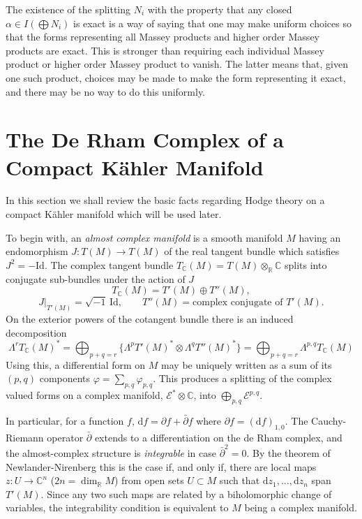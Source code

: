 \documentclass[11pt]{amsart}
\theoremstyle{plain}
\theoremstyle{definition}
\newcommand{\sE}{\mathscr{E}}
\newcommand{\dd}{\mathrm{d}}
\newcommand{\CC}{\mathbb{C}}
\newcommand{\RR}{\mathbb{R}}
\newcommand{\Id}{\mathrm{Id}}
\begin{document}
The existence of the splitting $N_{i}$ with the property that any closed $\alpha \in I(\bigoplus N_{i})$ is exact is a way of saying that one may make uniform choices so that the forms representing all Massey products and higher order Massey products are exact. This is stronger than requiring each individual Massey product or higher order Massey product to vanish. The latter means that, given one such product, choices may be made to make the form representing it exact, and there may be no way to do this uniformly.


\section{The De Rham Complex of a Compact K\"ahler Manifold}

In this section we shall review the basic facts regarding Hodge theory on a compact K\"ahler manifold which will be used later.

To begin with, an \emph{almost complex manifold} is a smooth manifold $M$ having an endomorphism $J \colon T(M) \to T(M)$ of the real tangent bundle which satisfies $J^{2} = -\Id$. The complex tangent bundle $T_{\CC}(M) = T(M) \otimes_{\RR} \CC$ splits into conjugate sub-bundles under the action of $J$
\[
T_{\CC}(M) = T'(M) \oplus T''(M),
\]
\[
J|_{T'(M)} = \sqrt{-1}\, \Id, \qquad T''(M) = \text{complex conjugate of } T'(M).
\]
On the exterior powers of the cotangent bundle there is an induced decomposition
\[
\Lambda^{r} T_{\CC}(M)^{*} = \bigoplus_{p+q=r} \{\Lambda^{p} T'(M)^{*} \otimes \Lambda^{q} T''(M)^{*}\} = \bigoplus_{p+q=r} \Lambda^{p,q} T_{\CC}(M)
\]
Using this, a differential form on $M$ may be uniquely written as a sum of its $(p,q)$ components $\varphi = \sum_{p,q} \varphi_{p,q}$. This produces a splitting of the complex valued forms on a complex manifold, $\sE^{*} \otimes \CC$, into $\bigoplus_{p,q} \sE^{p,q}$.

In particular, for a function $f$, $\dd f = \partial f + \bar{\partial} f$ where $\partial f = (\dd f)_{1,0}$. The Cauchy-Riemann operator $\bar{\partial}$ extends to a differentiation on the de Rham complex, and the almost-complex structure is \emph{integrable} in case $\bar{\partial}^{2} = 0$. By the theorem of Newlander-Nirenberg \cite{NN} this is the case if, and only if, there are local maps $z \colon U \to \CC^{n}$ ($2n = \dim_{\RR} M$) from open sets $U \subset M$ such that $\dd z_{1}, \ldots, \dd z_{n}$ span $T'(M)$. Since any two such maps are related by a biholomorphic change of variables, the integrability condition is equivalent to $M$ being a complex manifold.
\end{document}

